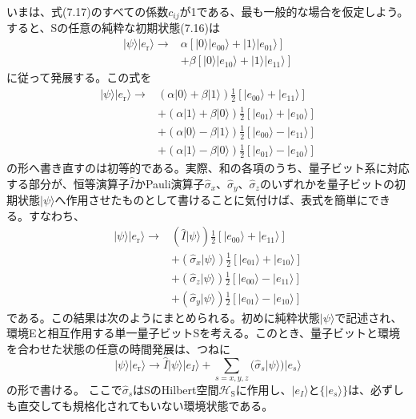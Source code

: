 いまは、式(7.17)のすべての係数$c_{ij}$が1である、最も一般的な場合を仮定しよう。すると、Sの任意の純粋な初期状態(7.16)は
\begin{equation}\begin{aligned}|\psi\rangle|e_{\mathrm r}\rangle\longrightarrow{}&\alpha[|0\rangle|e_{00}\rangle+|1\rangle|e_{01}\rangle]\\&+\beta[|0\rangle|e_{10}\rangle+|1\rangle|e_{11}\rangle]\end{aligned}\tag{7.19}\end{equation}
に従って発展する。この式を
\begin{equation}\begin{aligned}|\psi\rangle|e_{\mathrm r}\rangle\longrightarrow{}& (\alpha|0\rangle+\beta|1\rangle)\tfrac12[|e_{00}\rangle+|e_{11}\rangle]\\&+(\alpha|1\rangle+\beta|0\rangle)\tfrac12[|e_{01}\rangle+|e_{10}\rangle]\\&+(\alpha|0\rangle-\beta|1\rangle)\tfrac12[|e_{00}\rangle-|e_{11}\rangle]\\&+(\alpha|1\rangle-\beta|0\rangle)\tfrac12[|e_{01}\rangle-|e_{10}\rangle]\end{aligned}\tag{7.20}\end{equation}
の形へ書き直すのは初等的である。実際、和の各項のうち、量子ビット系に対応する部分が、恒等演算子$\hat I$かPauli演算子$\hat\sigma_x$、$\hat\sigma_y$、$\hat\sigma_z$のいずれかを量子ビットの初期状態$|\psi\rangle$へ作用させたものとして書けることに気付けば、表式を簡単にできる。すなわち、
\begin{equation}\begin{aligned}|\psi\rangle|e_{\mathrm r}\rangle\longrightarrow{}& (\hat I|\psi\rangle)\tfrac12[|e_{00}\rangle+|e_{11}\rangle]\\&+(\hat\sigma_x|\psi\rangle)\tfrac12[|e_{01}\rangle+|e_{10}\rangle]\\&+(\hat\sigma_z|\psi\rangle)\tfrac12[|e_{00}\rangle-|e_{11}\rangle]\\&+(\hat\sigma_y|\psi\rangle)\tfrac12[|e_{01}\rangle-|e_{10}\rangle]\end{aligned}\tag{7.21}\end{equation}
である。この結果は次のようにまとめられる。初めに純粋状態$|\psi\rangle$で記述され、環境Eと相互作用する単一量子ビットSを考える。このとき、量子ビットと環境を合わせた状態の任意の時間発展は、つねに
\begin{equation}|\psi\rangle|e_{\mathrm r}\rangle\longrightarrow\hat I|\psi\rangle|e_I\rangle+\sum_{s=x,y,z}(\hat\sigma_s|\psi\rangle)|e_s\rangle\tag{7.22}\end{equation}
の形で書ける。
\hypertarget{srcpage:309}{}\label{srcpage:309}
ここで$\hat\sigma_s$はSのHilbert空間$\mathcal H_{\mathrm S}$に作用し、$|e_I\rangle$と$\{|e_s\rangle\}$は、必ずしも直交しても規格化されてもいない環境状態である。

